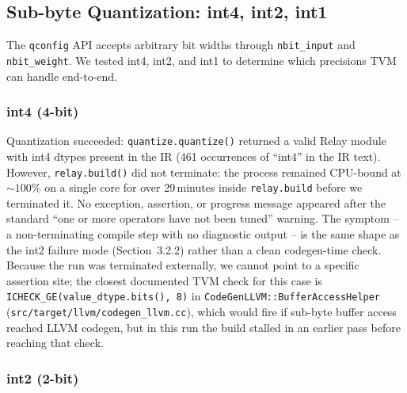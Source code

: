 \documentclass[11pt,a4paper]{article}
\begin{document}
\subsection{Sub-byte Quantization: int4, int2, int1}

The \texttt{qconfig} API accepts arbitrary bit widths through \texttt{nbit\_input} and \texttt{nbit\_weight}. We tested int4, int2, and int1 to determine which precisions TVM can handle end-to-end.

\subsubsection{int4 (4-bit)}

Quantization succeeded: \texttt{quantize.quantize()} returned a valid Relay module with int4 dtypes present in the IR (461 occurrences of ``int4'' in the IR text). However, \texttt{relay.build()} did not terminate: the process remained CPU-bound at ${\sim}100\%$ on a single core for over 29\,minutes inside \texttt{relay.build} before we terminated it. No exception, assertion, or progress message appeared after the standard ``one or more operators have not been tuned'' warning. The symptom -- a non-terminating compile step with no diagnostic output -- is the same shape as the int2 failure mode (Section~3.2.2) rather than a clean codegen-time check. Because the run was terminated externally, we cannot point to a specific assertion site; the closest documented TVM check for this case is \texttt{ICHECK\_GE(value\_dtype.bits(), 8)} in \texttt{CodeGenLLVM::\allowbreak BufferAccessHelper} (\texttt{src/target/llvm/\allowbreak codegen\_llvm.cc}), which would fire if sub-byte buffer access reached LLVM codegen, but in this run the build stalled in an earlier pass before reaching that check.

\subsubsection{int2 (2-bit)}
\end{document}
